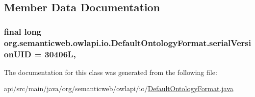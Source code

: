 \subsection{Member Data Documentation}
\hypertarget{classorg_1_1semanticweb_1_1owlapi_1_1io_1_1_default_ontology_format_a678f15adcdfdbf468cc0dd9600c4eb8f}{
\subsubsection[{serial\-Version\-U\-I\-D}]{\setlength{\rightskip}{0pt plus 5cm}final long org.\-semanticweb.\-owlapi.\-io.\-Default\-Ontology\-Format.\-serial\-Version\-U\-I\-D = 30406\-L\hspace{0.3cm}{\ttfamily [static]}, {\ttfamily [private]}}}\label{classorg_1_1semanticweb_1_1owlapi_1_1io_1_1_default_ontology_format_a678f15adcdfdbf468cc0dd9600c4eb8f}


The documentation for this class was generated from the following file\-:\begin{DoxyCompactItemize}
\item 
api/src/main/java/org/semanticweb/owlapi/io/\hyperlink{_default_ontology_format_8java}{Default\-Ontology\-Format.\-java}\end{DoxyCompactItemize}

